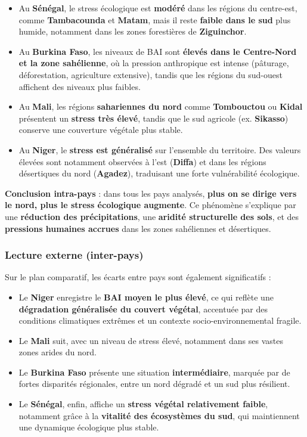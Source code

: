 \documentclass[
]{book}
\begin{document}
\begin{itemize}
\item
  Au \textbf{Sénégal}, le stress écologique est \textbf{modéré} dans les régions du centre-est, comme \textbf{Tambacounda} et \textbf{Matam}, mais il reste \textbf{faible dans le sud} plus humide, notamment dans les zones forestières de \textbf{Ziguinchor}.
\item
  Au \textbf{Burkina Faso}, les niveaux de BAI sont \textbf{élevés dans le Centre-Nord et la zone sahélienne}, où la pression anthropique est intense (pâturage, déforestation, agriculture extensive), tandis que les régions du sud-ouest affichent des niveaux plus faibles.
\item
  Au \textbf{Mali}, les régions \textbf{sahariennes du nord} comme \textbf{Tombouctou} ou \textbf{Kidal} présentent un \textbf{stress très élevé}, tandis que le sud agricole (ex. \textbf{Sikasso}) conserve une couverture végétale plus stable.
\item
  Au \textbf{Niger}, le \textbf{stress est généralisé} sur l'ensemble du territoire. Des valeurs élevées sont notamment observées à l'est (\textbf{Diffa}) et dans les régions désertiques du nord (\textbf{Agadez}), traduisant une forte vulnérabilité écologique.
\end{itemize}

\textbf{Conclusion intra-pays} : dans tous les pays analysés, \textbf{plus on se dirige vers le nord, plus le stress écologique augmente}. Ce phénomène s'explique par une \textbf{réduction des précipitations}, une \textbf{aridité structurelle des sols}, et des \textbf{pressions humaines accrues} dans les zones sahéliennes et désertiques.

\subsubsection{Lecture externe (inter-pays)}\label{lecture-externe-inter-pays-1}

Sur le plan comparatif, les écarts entre pays sont également significatifs :

\begin{itemize}
\item
  Le \textbf{Niger} enregistre le \textbf{BAI moyen le plus élevé}, ce qui reflète une \textbf{dégradation généralisée du couvert végétal}, accentuée par des conditions climatiques extrêmes et un contexte socio-environnemental fragile.
\item
  Le \textbf{Mali} suit, avec un niveau de stress élevé, notamment dans ses vastes zones arides du nord.
\item
  Le \textbf{Burkina Faso} présente une situation \textbf{intermédiaire}, marquée par de fortes disparités régionales, entre un nord dégradé et un sud plus résilient.
\item
  Le \textbf{Sénégal}, enfin, affiche un \textbf{stress végétal relativement faible}, notamment grâce à la \textbf{vitalité des écosystèmes du sud}, qui maintiennent une dynamique écologique plus stable.
\end{itemize}
\end{document}
